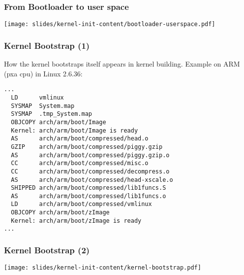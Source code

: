 \begin{frame}
  \frametitle{From Bootloader to user space}
  \begin{center}
    \texttt{[image: slides/kernel-init-content/bootloader-userspace.pdf]}
  \end{center}
\end{frame}

\begin{frame}[fragile]
  \frametitle{Kernel Bootstrap (1)}
  How the kernel bootstraps itself appears in kernel building.
  Example on ARM (pxa cpu) in Linux 2.6.36:
{\footnotesize
\begin{verbatim}
...
  LD      vmlinux
  SYSMAP  System.map
  SYSMAP  .tmp_System.map
  OBJCOPY arch/arm/boot/Image
  Kernel: arch/arm/boot/Image is ready
  AS      arch/arm/boot/compressed/head.o
  GZIP    arch/arm/boot/compressed/piggy.gzip
  AS      arch/arm/boot/compressed/piggy.gzip.o
  CC      arch/arm/boot/compressed/misc.o
  CC      arch/arm/boot/compressed/decompress.o
  AS      arch/arm/boot/compressed/head-xscale.o
  SHIPPED arch/arm/boot/compressed/lib1funcs.S
  AS      arch/arm/boot/compressed/lib1funcs.o
  LD      arch/arm/boot/compressed/vmlinux
  OBJCOPY arch/arm/boot/zImage
  Kernel: arch/arm/boot/zImage is ready
...
\end{verbatim}
}
\end{frame}

\begin{frame}
  \frametitle{Kernel Bootstrap (2)}
  \begin{center}
    \texttt{[image: slides/kernel-init-content/kernel-bootstrap.pdf]}
  \end{center}
\end{frame}

